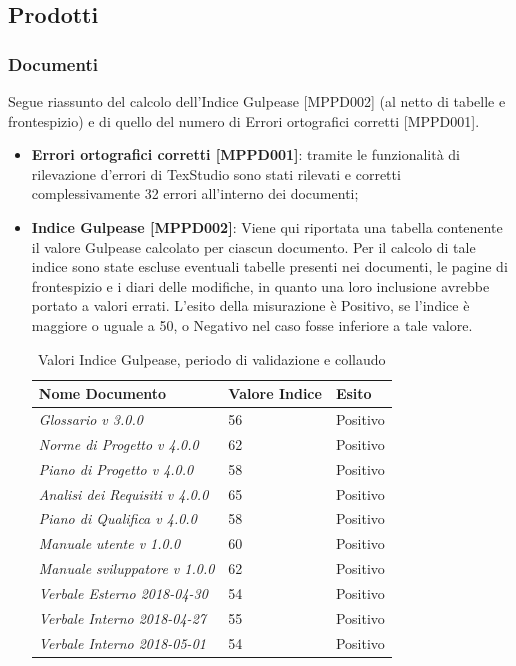 \documentclass[openany,12pt,a4paper]{report}
\begin{document}
\subsection{Prodotti}

\subsubsection{Documenti}

Segue riassunto del calcolo dell'Indice Gulpease [MPPD002] (al netto di tabelle e frontespizio) e di quello del numero di Errori ortografici corretti [MPPD001].

\begin{itemize}
	\item \textbf{Errori ortografici corretti [MPPD001]}: tramite le funzionalità di rilevazione d'errori di TexStudio sono stati rilevati e corretti complessivamente 32 errori all'interno dei documenti;
	
	\item \textbf{Indice Gulpease [MPPD002]}: Viene qui riportata una tabella contenente il valore Gulpease calcolato per ciascun documento.
	Per il calcolo di tale indice sono state escluse eventuali tabelle presenti nei documenti, le pagine di frontespizio e i diari delle modifiche, in quanto una loro inclusione avrebbe portato a valori errati. L'esito della misurazione è Positivo, se l'indice è maggiore o uguale a 50, o Negativo nel caso fosse inferiore a tale valore.
	
	\begin{table}[h]
		\begin{center}
			\setlength\LTleft{6mm}
			\begin{longtable}{|p{60mm}|p{30mm}|p{25mm}|}
				\hline  
				\textbf{Nome Documento} & \textbf{Valore Indice} & \textbf{Esito} \\ \hline    
				\textit{Glossario v 3.0.0} & 56 & Positivo\\ \hline    
				\textit{Norme di Progetto v 4.0.0} & 62 & Positivo\\ \hline    
				\textit{Piano di Progetto v 4.0.0} & 58 & Positivo\\ \hline    
				\textit{Analisi dei Requisiti v 4.0.0} & 65 & Positivo\\ \hline    
				\textit{Piano di Qualifica v 4.0.0} & 58 & Positivo\\ \hline    
				\textit{Manuale utente v 1.0.0} & 60 & Positivo\\ \hline    
				\textit{Manuale sviluppatore v 1.0.0} & 62 & Positivo\\ \hline    
				\textit{Verbale Esterno 2018-04-30} & 54 & Positivo\\ \hline
				\textit{Verbale Interno 2018-04-27} & 55 & Positivo\\ \hline
				\textit{Verbale Interno 2018-05-01} & 54 & Positivo\\ \hline
			\end{longtable}
		\end{center}
		\caption{Valori Indice Gulpease, periodo di validazione e collaudo} 
	\end{table} 
	

\end{itemize}
\end{document}

